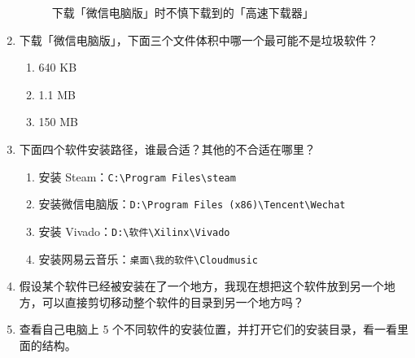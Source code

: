 \begin{enumerate}
\begin{figure}[htbp]
    \caption{下载「微信电脑版」时不慎下载到的「高速下载器」}
    \label{how-to-download-it-4}
  \end{figure}
  \item 下载「微信电脑版」，下面三个文件体积中哪一个最可能不是垃圾软件？
  \begin{enumerate}
    \item 640 KB 
    \item 1.1 MB
    \item 150 MB  
  \end{enumerate}
  \item 下面四个软件安装路径，谁最合适？其他的不合适在哪里？
  \begin{enumerate}
    \item 安装 Steam：\verb|C:\Program Files\steam|
    \item 安装微信电脑版：\verb|D:\Program Files (x86)\Tencent\Wechat|
    \item 安装 Vivado：\verb|D:\软件\Xilinx\Vivado|
    \item 安装网易云音乐：\verb|桌面\我的软件\Cloudmusic|
  \end{enumerate}
  \item 假设某个软件已经被安装在了一个地方，我现在想把这个软件放到另一个地方，可以直接剪切移动整个软件的目录到另一个地方吗？
  \item 查看自己电脑上 5 个不同软件的安装位置，并打开它们的安装目录，看一看里面的结构。
\end{enumerate}